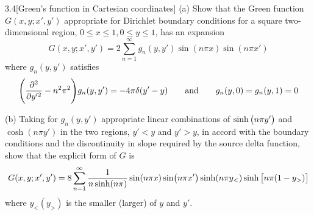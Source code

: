 \documentclass[12pt]{article}
\begin{document}
\begin{problem}{3.4}[Green's function in Cartesian coordinates]
(a) Show that the Green function $G(x,y;x',y')$ appropriate for Dirichlet
boundary conditions for a square two-dimensional region, $0\leq x\leq1,0\leq
y\leq1$, has an expansion
\begin{equation}
    G(x,y;x',y')=2\sum_{n=1}^\infty g_n(y,y')\sin(n\pi x)\sin(n\pi x') 
\end{equation}
where $g_n(y,y')$ satisfies
\begin{equation}
    \qty(\frac{\partial^2}{\partial y'^2}-n^2\pi^2)g_n(y,y')
    =-4\pi\delta(y'-y)
    \qquad\text{and}\qquad
    g_n(y,0)=g_n(y,1)=0
\end{equation}

(b) Taking for $g_n(y,y')$ appropriate linear combinations of $\sinh\qty(n\pi
y')$ and $\cosh(n\pi y')$ in the two regions, $y'<y$ and $y'>y$, in accord with
the boundary conditions and the discontinuity in slope required by the source
delta function, show that the explicit form of $G$ is
\begin{equation}
    G(x,y;x',y')=8\sum_{n=1}^\infty
        \frac{1}{n\sinh(n\pi)}\sin(n\pi x)\sin(n\pi x')\sinh(n\pi
        y_<)\sinh\qty[n\pi\qty(1-y_>)]
\end{equation}
where $y_<(y_>)$ is the smaller (larger) of $y$ and $y'$.
\end{problem}
\end{document}
